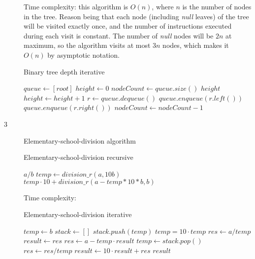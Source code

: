 \documentclass{article}
\begin{document}
\begin{description}
  Time complexity: this algorithm is $O(n)$, where $n$ is the number of nodes in the tree. Reason being that each node (including \textit{null} leaves) of the tree will be visited exactly once, and the number of instructions executed during each visit is constant. The number of \textit{null} nodes will be $2n$ at maximum, so the algorithm visits at most $3n$ nodes, which makes it $O(n)$ by asymptotic notation.

  \begin{algorithm}
  \caption{Binary tree depth iterative}
    \begin{algorithmic}[1]
      \State $queue \gets [root]$
      \State $height \gets 0$
        \State $nodeCount \gets queue.size()$
          \State \Return $height$
        \EndIf
        \State $height \gets height + 1$
          \State $r \gets queue.dequeue()$
             \State $queue.enqueue(r.left())$
          \EndIf
             \State $queue.enqueue(r.right())$
          \EndIf
          $nodeCount \gets nodeCount - 1$
        \EndWhile
      \EndWhile
    \EndFunction
    \end{algorithmic}
  \end{algorithm}

\item[3]{Elementary-school-division algorithm}

  \begin{algorithm}
  \caption{Elementary-school-division recursive}
    \begin{algorithmic}[1]
        \State \Return $a/b$
      \Else {} 
        \State $temp \gets division\_r(a, 10b)$
        \State \Return $temp \cdot 10 + division\_r(a - temp * 10 * b, b)$
      \EndIf
    \EndFunction
    \end{algorithmic}
  \end{algorithm}

  Time complexity: 

  \begin{algorithm}
  \caption{Elementary-school-division iterative}
    \begin{algorithmic}[1]
      \State $temp \gets b$
      \State $stack \gets []$
        \State $stack.push(temp)$
        \State $temp = 10 \cdot temp$
      \EndWhile
      \State $res \gets a / temp$
      \State $result \gets res$
        \State $res \gets a - temp \cdot result$
        \State $temp \gets stack.pop()$
        \State $res \gets res / temp$
        \State $result \gets 10 \cdot result + res$
      \EndWhile
      \State \Return $result$
    \EndFunction
    \end{algorithmic}
  \end{algorithm}


\end{description}
\end{document}
